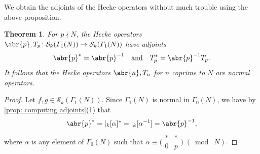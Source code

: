 \documentclass[10pt,leqno,twoside]{article}
\theoremstyle{plain}
\newtheorem{theorem}[lem]{Theorem}
\theoremstyle{definition}
\numberwithin{equation}{section}
\numberwithin{lem}{section}
\newcommand{\smod}[1]{\;(\bmod\; #1)}
\begin{document}
We obtain the adjoints of the Hecke operators without much trouble using the above proposition.
\begin{theorem}
    For $p\nmid N$, the Hecke operators $\abr{p},T_p\colon \mathcal S_k(\varGamma_1(N))\to \mathcal S_k(\varGamma_1(N))$ have adjoints \[\abr{p}^\ast = \abr{p}^{-1}\quad\text{and}\quad T_p^\ast = \abr{p}^{-1}T_p.\] It follows that the Hecke operators $\abr{n},T_n$ for $n$ coprime to $N$ are normal operators.
\end{theorem}
\begin{proof}
    Let $f,g\in\mathcal S_k(\varGamma_1(N))$. Since $\varGamma_1(N)$ is normal in $\varGamma_0(N)$, we have by \cref{prop: computing adjoints}(1) that 
    \[\abr{p}^\ast = |_k[\alpha]^\ast = |_k[\alpha^{-1}] = \abr{p}^{-1},\] where $\alpha$ is any element of $\varGamma_0(N)$ such that $\alpha\equiv \big(\!\begin{smallmatrix}
        \ast & \ast \\ 0 & p
    \end{smallmatrix}\!\big)\smod N$.
    

\end{proof}
\end{document}
